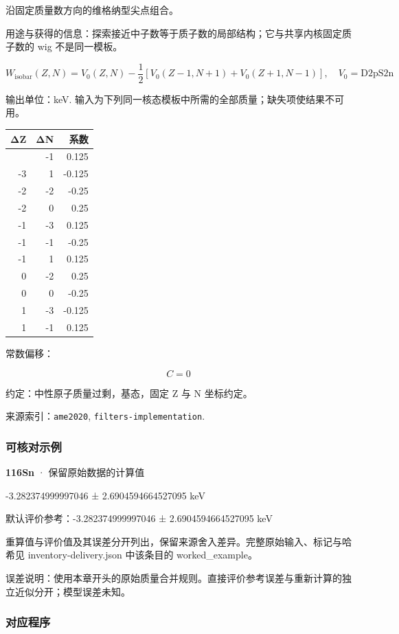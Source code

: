 \documentclass[
  11pt,
  letterpaper,
]{article}
\begin{document}
沿固定质量数方向的维格纳型尖点组合。

用途与获得的信息：探索接近中子数等于质子数的局部结构；它与共享内核固定质子数的
wig 不是同一模板。

\[
W_{\mathrm{isobar}}(Z,N)=V_0(Z,N)-\frac12[V_0(Z-1,N+1)+V_0(Z+1,N-1)],\quad V_0={\mathrm{D2pS2n}}
\]

输出单位：keV.
输入为下列同一核态模板中所需的全部质量；缺失项使结果不可用。

\begin{longtable}[]{@{}rrr@{}}
\toprule\noalign{}
ΔZ & ΔN & 系数 \\
\midrule\noalign{}
\endhead
\bottomrule\noalign{}
\endlastfoot
-3 & -1 & 0.125 \\
-3 & 1 & -0.125 \\
-2 & -2 & -0.25 \\
-2 & 0 & 0.25 \\
-1 & -3 & 0.125 \\
-1 & -1 & -0.25 \\
-1 & 1 & 0.125 \\
0 & -2 & 0.25 \\
0 & 0 & -0.25 \\
1 & -3 & -0.125 \\
1 & -1 & 0.125 \\
\end{longtable}

常数偏移：

\[
C=0
\]

约定：中性原子质量过剩，基态，固定 Z 与 N 坐标约定。

来源索引：\texttt{ame2020}, \texttt{filters-implementation}.

\subsubsection{可核对示例}\label{ux53efux6838ux5bf9ux793aux4f8b-38}

\textbf{116Sn} · 保留原始数据的计算值

-3.282374999997046 ± 2.6904594664527095 keV

默认评价参考：-3.282374999997046 ± 2.6904594664527095 keV

重算值与评价值及其误差分开列出，保留来源舍入差异。完整原始输入、标记与哈希见
inventory-delivery.json 中该条目的 worked\_example。

误差说明：使用本章开头的原始质量合并规则。直接评价参考误差与重新计算的独立近似分开；模型误差未知。

\subsubsection{对应程序}\label{ux5bf9ux5e94ux7a0bux5e8f-38}
\end{document}
